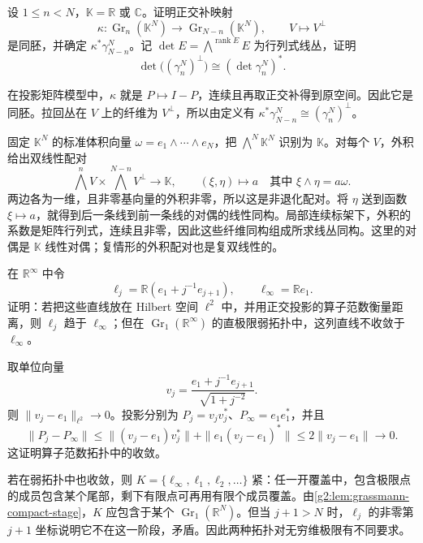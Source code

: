 \begin{exercise}\label{g2:ex:grassmann-complement-determinant}
	设 \(1\le n<N\)，\(\mathbb K=\mathbb R\) 或 \(\mathbb C\)。证明正交补映射
	\[
		\kappa:\operatorname{Gr}_n(\mathbb K^N)\longrightarrow
		\operatorname{Gr}_{N-n}(\mathbb K^N),\qquad V\longmapsto V^\perp
	\]
	是同胚，并确定 \(\kappa^*\gamma_{N-n}^N\)。记 \(\det E=\bigwedge^{\operatorname{rank}E}E\) 为行列式线丛，证明
	\[
		\det\bigl((\gamma_n^N)^\perp\bigr)\cong(\det\gamma_n^N)^*.
	\]
\end{exercise}
\begin{solution}
	在投影矩阵模型中，\(\kappa\) 就是 \(P\mapsto I-P\)，连续且再取正交补得到原空间。因此它是同胚。拉回丛在 \(V\) 上的纤维为 \(V^\perp\)，所以由定义有 \(\kappa^*\gamma_{N-n}^N\cong(\gamma_n^N)^\perp\)。

	固定 \(\mathbb K^N\) 的标准体积向量 \(\omega=e_1\wedge\cdots\wedge e_N\)，把 \(\bigwedge^N\mathbb K^N\) 识别为 \(\mathbb K\)。对每个 \(V\)，外积给出双线性配对
	\[
		\bigwedge^nV\times\bigwedge^{N-n}V^\perp\longrightarrow\mathbb K,
		\qquad (\xi,\eta)\longmapsto a\quad\text{其中 }\xi\wedge\eta=a\omega.
	\]
	两边各为一维，且非零基向量的外积非零，所以这是非退化配对。将 \(\eta\) 送到函数 \(\xi\mapsto a\)，就得到后一条线到前一条线的对偶的线性同构。局部连续标架下，外积的系数是矩阵行列式，连续且非零，因此这些纤维同构组成所求线丛同构。这里的对偶是 \(\mathbb K\) 线性对偶；复情形的外积配对也是复双线性的。
\end{solution}

\begin{exercise}\label{g2:ex:weak-grassmann-topology}
	在 \(\mathbb R^\infty\) 中令
	\[
		\ell_j=\mathbb R(e_1+j^{-1}e_{j+1}),\qquad \ell_\infty=\mathbb Re_1.
	\]
	证明：若把这些直线放在 Hilbert 空间 \(\ell^2\) 中，并用正交投影的算子范数衡量距离，则 \(\ell_j\) 趋于 \(\ell_\infty\)；但在 \(\operatorname{Gr}_1(\mathbb R^\infty)\) 的直极限弱拓扑中，这列直线不收敛于 \(\ell_\infty\)。
\end{exercise}
\begin{solution}
	取单位向量
	\[
		v_j=\frac{e_1+j^{-1}e_{j+1}}{\sqrt{1+j^{-2}}}.
	\]
	则 \(\|v_j-e_1\|_{\ell^2}\to0\)。投影分别为 \(P_j=v_jv_j^*\)、\(P_\infty=e_1e_1^*\)，并且
	\[
		\|P_j-P_\infty\|
		\le\|(v_j-e_1)v_j^*\|+\|e_1(v_j-e_1)^*\|
		\le2\|v_j-e_1\|\longrightarrow0.
	\]
	这证明算子范数拓扑中的收敛。

	若在弱拓扑中也收敛，则 \(K=\{\ell_\infty,\ell_1,\ell_2,\ldots\}\) 紧：任一开覆盖中，包含极限点的成员包含某个尾部，剩下有限点可再用有限个成员覆盖。由\cref{g2:lem:grassmann-compact-stage}，\(K\) 应包含于某个 \(\operatorname{Gr}_1(\mathbb R^N)\)。但当 \(j+1>N\) 时，\(\ell_j\) 的非零第 \(j+1\) 坐标说明它不在这一阶段，矛盾。因此两种拓扑对无穷维极限有不同要求。
\end{solution}


